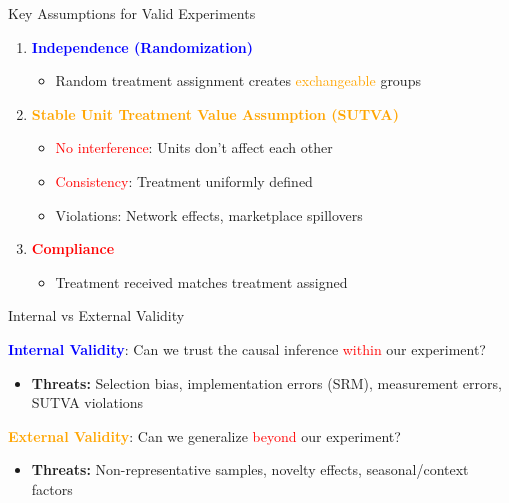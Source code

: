\documentclass{beamer}
\newcommand{\blue}[1]{\textcolor{blue}{#1}}
\newcommand{\red}[1]{\textcolor{red}{#1}}
\newcommand{\orange}[1]{\textcolor{orange}{#1}}
\begin{document}
\begin{frame}{Key Assumptions for Valid Experiments }

\begin{enumerate}
    \item \textbf{\blue{Independence (Randomization)}}
    \begin{itemize}
        \item Random treatment assignment creates \orange{exchangeable} groups
    \end{itemize}

    \item \textbf{\orange{Stable Unit Treatment Value Assumption (SUTVA)}}
    \begin{itemize}
        \item \red{No interference}: Units don't affect each other
        \item \red{Consistency}: Treatment uniformly defined
        \item Violations: Network effects, marketplace spillovers
    \end{itemize}

    \item \textbf{\red{Compliance}}
    \begin{itemize}
        \item Treatment received matches treatment assigned
    \end{itemize}
\end{enumerate}

\end{frame}


\begin{frame}{Internal vs External Validity }

\textbf{\blue{Internal Validity}}: Can we trust the causal inference \red{within} our experiment?
\begin{itemize}
    \item \textbf{Threats:} Selection bias, implementation errors (SRM), measurement errors, SUTVA violations
\end{itemize}

\vspace{0.15cm}
\textbf{\orange{External Validity}}: Can we generalize \red{beyond} our experiment?
\begin{itemize}
    \item \textbf{Threats:} Non-representative samples, novelty effects, seasonal/context factors
\end{itemize}

\end{frame}
\end{document}
